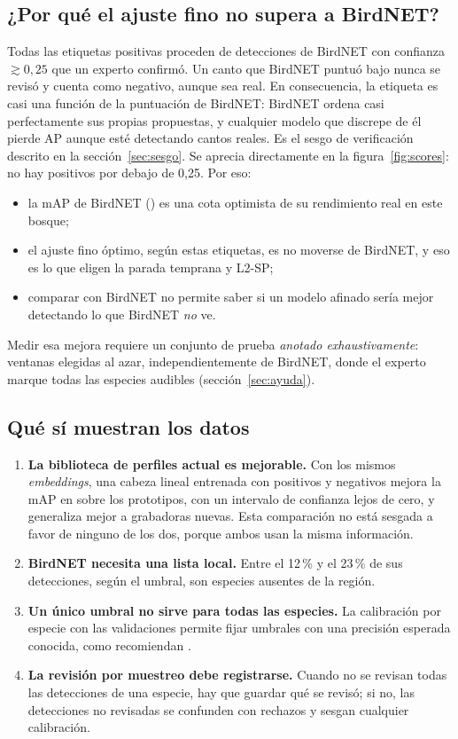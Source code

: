 \documentclass[11pt,a4paper]{article}
\begin{document}
\subsection{¿Por qué el ajuste fino no supera a BirdNET?}
Todas las etiquetas positivas proceden de detecciones de BirdNET con confianza $\gtrsim 0{,}25$ que un experto confirmó. Un canto que BirdNET puntuó
bajo nunca se revisó y cuenta como negativo, aunque sea real. En consecuencia, la etiqueta es casi una función de la puntuación de BirdNET: BirdNET
ordena casi perfectamente sus propias propuestas, y cualquier modelo que discrepe de él pierde AP aunque esté detectando cantos reales. Es el sesgo de verificación
descrito en la sección~\ref{sec:sesgo}. Se aprecia directamente en la figura~\ref{fig:scores}: no hay positivos por debajo de 0,25. Por eso:
\begin{itemize}
  \item la mAP de BirdNET (\mapBirdnet) es una cota optimista de su rendimiento real en este bosque;
  \item el ajuste fino óptimo, según estas etiquetas, es no moverse de BirdNET, y eso es lo que eligen la parada temprana y L2-SP;
  \item comparar con BirdNET no permite saber si un modelo afinado sería mejor detectando lo que BirdNET \emph{no} ve.
\end{itemize}
Medir esa mejora requiere un conjunto de prueba \emph{anotado exhaustivamente}: ventanas elegidas al azar, independientemente de BirdNET, donde el experto
marque todas las especies audibles (sección~\ref{sec:ayuda}).

\subsection{Qué sí muestran los datos}
\begin{enumerate}
  \item \textbf{La biblioteca de perfiles actual es mejorable.} Con los mismos \emph{embeddings}, una cabeza lineal entrenada con positivos y negativos mejora
        la mAP en \deltaLinearVsProto{} sobre los prototipos, con un intervalo de confianza lejos de cero, y generaliza mejor a grabadoras nuevas. Esta comparación no está
        sesgada a favor de ninguno de los dos, porque ambos usan la misma información.
  \item \textbf{BirdNET necesita una lista local.} Entre el 12\,\% y el 23\,\% de sus detecciones, según el umbral, son especies ausentes de la región.
  \item \textbf{Un único umbral no sirve para todas las especies.} La calibración por especie con las validaciones permite fijar umbrales con una precisión
        esperada conocida, como recomiendan \citet{wood2024guidelines}.
  \item \textbf{La revisión por muestreo debe registrarse.} Cuando no se revisan todas las detecciones de una especie, hay que guardar qué se revisó; si no,
        las detecciones no revisadas se confunden con rechazos y sesgan cualquier calibración.
\end{enumerate}
\end{document}
